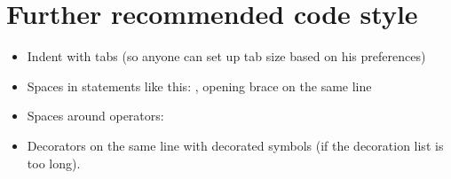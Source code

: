 \section{Further recommended code style}
\begin{itemize}
	\item Indent with tabs (so anyone can set up tab size based on his preferences)
	\item Spaces in statements like this: , opening brace on the same line
	\item Spaces around operators: 
	\item Decorators on the same line with decorated symbols (if the decoration list is too long).
\end{itemize}

          

